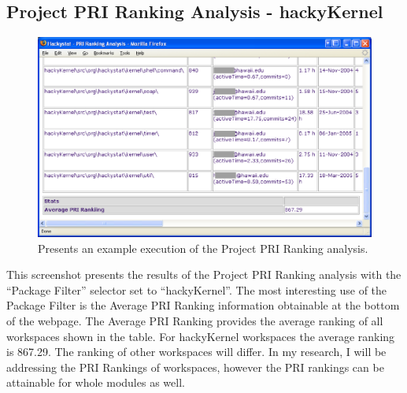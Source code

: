 \subsection{Project PRI Ranking Analysis - hackyKernel }
\label{subsection:projectPriRanking-hackyKernel}
\begin{figure}[ht]
  \centering
  \includegraphics[width=1.00\textwidth]{figs/UserInterface/analysis-priRanking-hackyKernel-hidden.eps}
  \caption[Execution of the Project PRI Ranking analysis]{Presents an
    example execution of the Project PRI Ranking analysis.}  
  \label{fig:analysis-priRanking-hackyKernel}
\end{figure}
This screenshot presents the results of the Project PRI Ranking analysis
with the ``Package Filter'' selector set to ``hackyKernel''. The most
interesting use of the Package Filter is the Average PRI Ranking
information obtainable at the bottom of the webpage. The Average PRI
Ranking provides the average ranking of all workspaces shown in the table.
For hackyKernel workspaces the average ranking is 867.29. The ranking of
other workspaces will differ. In my research, I will be addressing the PRI
Rankings of workspaces, however the PRI rankings can be attainable for
whole modules as well.

\clearpage
